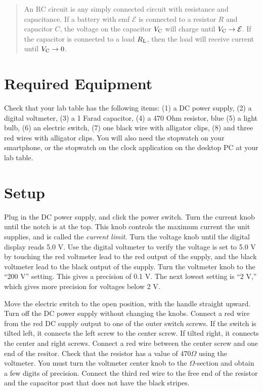 \documentclass[12pt]{article}
\begin{document}
\maketitle

\begin{abstract}
An RC circuit is any simply connected circuit with resistance and capacitance.  If a battery with emf $\mathcal{E}$ is connected to a resistor $R$ and capacitor $C$, the voltage on the capacitor $V_{\rm C}$ will charge until $V_{\rm C} \to \mathcal{E}$.  If the capacitor is connected to a load $R_{\rm L}$, then the load will receive current until $V_{\rm C} \to 0$.
\end{abstract}

\section{Required Equipment}

Check that your lab table has the following items: (1) a DC power supply, (2) a digital voltmeter, (3) a 1 Farad capacitor, (4) a 470 Ohm resistor, blue (5) a light bulb, (6) an electric switch, (7) one black wire with alligator clips, (8) and three red wires with alligator clips.  You will also need the stopwatch on your smartphone, or the stopwatch on the clock application on the desktop PC at your lab table.

\section{Setup}

Plug in the DC power supply, and click the power switch.  Turn the current knob until the notch is at the top.  This knob controls the maximum current the unit supplies, and is called the \textit{current limit.}  Turn the voltage knob until the digital display reads 5.0 V.  Use the digital voltmeter to verify the voltage is set to 5.0 V by touching the red voltmeter lead to the red output of the supply, and the black voltmeter lead to the black output of the supply.  Turn the voltmeter knob to the ``200 V'' setting.  This gives a precision of 0.1 V.  The next lowest setting is ``2 V,'' which gives more precision for voltages below 2 V.

Move the electric switch to the open position, with the handle straight upward.  Turn off the DC power supply without changing the knobs.  Connect a red wire from the red DC supply output to one of the outer switch screws.  If the switch is tilted left, it connects the left screw to the center screw.  If tilted right, it connects the center and right screws.  Connect a red wire between the center screw and one end of the resitor.  Check that the resistor has a value of $470 \Omega$ using the voltmeter.  You must turn the voltmeter center knob to the $\Omega$-section and obtain a few digits of precision.  Connect the third red wire to the free end of the resistor and the capacitor post that does not have the black stripes.
\end{document}
